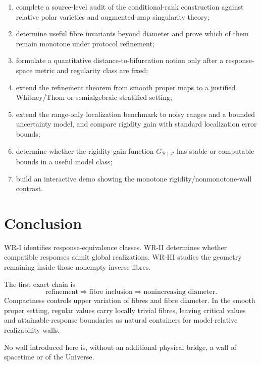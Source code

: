 \documentclass[11pt]{article}
\newcommand{\Acal}{\mathcal A}
\newcommand{\Bcal}{\mathcal B}
\begin{document}
\begin{enumerate}
\item complete a source-level audit of the conditional-rank construction
against relative polar varieties and augmented-map singularity theory;
\item determine useful fibre invariants beyond diameter and prove which of
them remain monotone under protocol refinement;
\item formulate a quantitative distance-to-bifurcation notion only after a
response-space metric and regularity class are fixed;
\item extend the refinement theorem from smooth proper maps to a justified
Whitney/Thom or semialgebraic stratified setting;
\item extend the range-only localization benchmark to noisy ranges and a
bounded uncertainty model, and compare rigidity gain with standard localization
error bounds;
\item determine whether the rigidity-gain function
\(G_{\Bcal\mid\Acal}\) has stable or computable bounds in a useful model
class;
\item build an interactive demo showing the monotone rigidity/nonmonotone-wall
contrast.
\end{enumerate}

\section*{Conclusion}

WR-I identifies response-equivalence classes. WR-II determines whether
compatible responses admit global realizations. WR-III studies the geometry
remaining inside those nonempty inverse fibres.

The first exact chain is
\[
\text{refinement}
\Longrightarrow
\text{fibre inclusion}
\Longrightarrow
\text{nonincreasing diameter}.
\]
Compactness controls upper variation of fibres and fibre diameter. In the
smooth proper setting, regular values carry locally trivial fibres, leaving
critical values and attainable-response boundaries as natural containers for
model-relative realizability walls.

No wall introduced here is, without an additional physical bridge, a wall of
spacetime or of the Universe.
\end{document}
